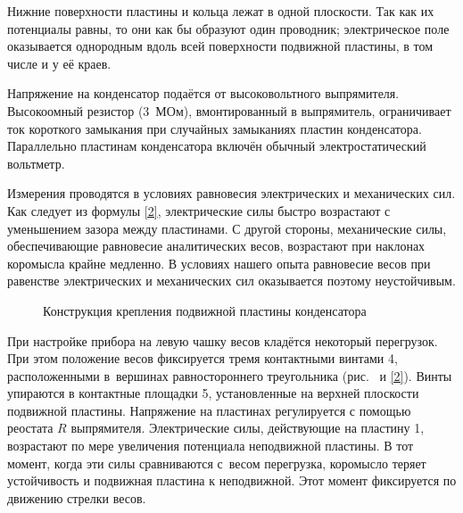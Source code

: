 Нижние поверхности пластины и кольца лежат в одной плоскости. Так как их
потенциалы равны, то они как бы образуют один
проводник; электрическое поле оказывается однородным вдоль всей поверхности
подвижной пластины, в том числе и у её краев.

Напряжение на конденсатор подаётся от высоковольтного выпрямителя. Высокоомный
резистор (3~МОм), вмонтированный в
выпрямитель, ограничивает ток короткого замыкания при случайных замыканиях
пластин конденсатора. Параллельно пластинам
конденсатора включён обычный электростатический вольтметр.

Измерения проводятся в условиях равновесия электрических и механических сил. Как
следует из формулы \eqref{2},
электрические силы быстро возрастают с уменьшением зазора между пластинами. С
другой стороны, механические силы,
обеспечивающие равновесие аналитических весов, возрастают при наклонах коромысла
крайне медленно. В условиях нашего опыта равновесие весов при равенстве
электрических и механических сил оказывается поэтому неустойчивым.

\begin{wrapfigure}{r}{0.4\textwidth}
	\caption{Конструкция крепления подвижной пластины конденсатора}
\end{wrapfigure}

При настройке прибора на левую чашку весов кладётся некоторый перегрузок. При
этом положение весов фиксируется тремя
контактными винтами 4, расположенными в~вершинах равностороннего треугольника
(рис.~ и \eqref{2}). Винты упираются в
контактные площадки 5, установленные на верхней плоскости подвижной пластины.
Напряжение на пластинах регулируется с
помощью реостата $R$ выпрямителя. Электрические силы, действующие на пластину 1,
возрастают по мере увеличения
потенциала неподвижной пластины. В тот момент, когда эти силы сравниваются
с~весом перегрузка, коромысло теряет
устойчивость и подвижная пластина  к неподвижной. Этот момент
фиксируется по движению стрелки весов.

